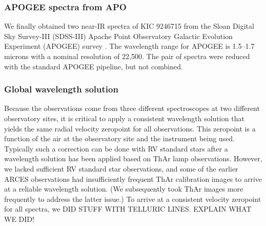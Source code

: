\subsubsection{APOGEE spectra from APO}\label{apogee}
We finally obtained two near-IR spectra of KIC 9246715 from the Sloan Digital Sky Survey-III (SDSS-III) Apache Point Observatory Galactic Evolution Experiment (APOGEE) survey \citep{2015arXiv150100963A}. The wavelength range for APOGEE is 1.5--1.7 microns with a nominal resolution of 22,500. The pair of spectra were reduced with the standard APOGEE pipeline, but not combined.

\subsubsection{Global wavelength solution}\label{wavelength}
Because the observations come from three different spectroscopes at two different observatory sites, it is critical to apply a consistent wavelength solution that yields the same radial velocity zeropoint for all observations. This zeropoint is a function of the air at the observatory site and the instrument being used. Typically such a correction can be done with RV standard stars after a wavelength solution has been applied based on ThAr lamp observations. However, we lacked sufficient RV standard star observations, and some of the earlier ARCES observations had insufficiently frequent ThAr calibration images to arrive at a reliable wavelength solution. (We subsequently took ThAr images more frequently to address the latter issue.) To arrive at a consistent velocity zeropoint for all spectra, we DID STUFF WITH TELLURIC LINES.
EXPLAIN WHAT WE DID!